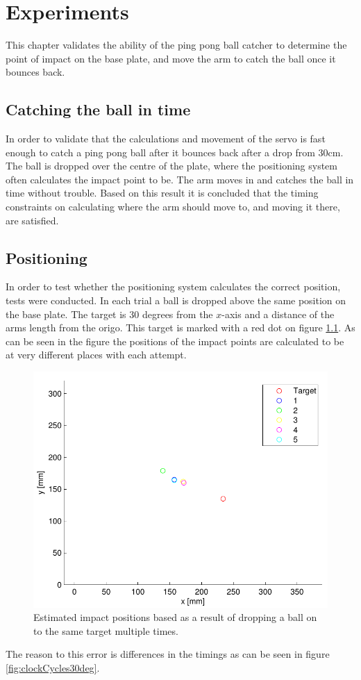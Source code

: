 \chapter{Experiments} %
\label{chap:experiments}
This chapter validates the ability of the ping pong ball catcher to determine the point of impact on the base plate, and move the arm to catch the ball once it bounces back.

\section{Catching the ball in time}
In order to validate that the calculations and movement of the servo is fast enough to catch a ping pong ball after it bounces back after a drop from $30\si{\centi\meter}$.
The ball is dropped over the centre of the plate, where the positioning system often calculates the impact point to be.
The arm moves in and catches the ball in time without trouble.
Based on this result it is concluded that the timing constraints on calculating where the arm should move to, and moving it there, are satisfied.

\section{Positioning}
In order to test whether the positioning system calculates the correct position, tests were conducted.
In each trial a ball is dropped above the same position on the base plate.
The target is 30 degrees from the $x$-axis and a distance of the arms length from the origo.
This target is marked with a red dot on figure \ref{fig:testRes30deg}.
As can be seen in the figure the positions of the impact points are calculated to be at very different places with each attempt.
\begin{figure}[htb]
	\centering
	\includegraphics[width=.8\textwidth]{figures/testRes30deg.pdf}
	\caption{Estimated impact positions based as a result of dropping a ball on to the same target multiple times.}
	\label{fig:testRes30deg}
\end{figure}
The reason to this error is differences in the timings as can be seen in figure \ref{fig:clockCycles30deg}.

